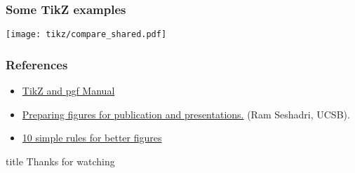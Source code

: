 \documentclass[hyperref={pdfpagelayout=SinglePage}]{beamer}
\def\tcb{\color{blue}}
\begin{document}
\begin{frame}
\frametitle{Some TikZ examples}
\begin{center}
\texttt{[image: tikz/compare\_shared.pdf]}
\end{center}
\end{frame}
\begin{frame}
\frametitle{References}
\begin{itemize}
    \item \href{https://www.bu.edu/math/files/2013/08/tikzpgfmanual.pdf}{\tcb TikZ and pgf Manual}
    \item \href{http://www.mrl.ucsb.edu/~seshadri/PreparingFigures.pdf}{\tcb Preparing figures for publication and presentations.} (Ram Seshadri, UCSB).
    \item \href{http://journals.plos.org/ploscompbiol/article?id=10.1371/journal.pcbi.1003833}{\tcb 10 simple rules for better figures}
\end{itemize}

\end{frame}
















  \begin{frame}
  \vfill
  \centering
  \begin{beamercolorbox}[sep=8pt,center,shadow=true,rounded=true]{title}
     Thanks for watching%
  \end{beamercolorbox}
  \vfill
  \end{frame}
\end{document}
